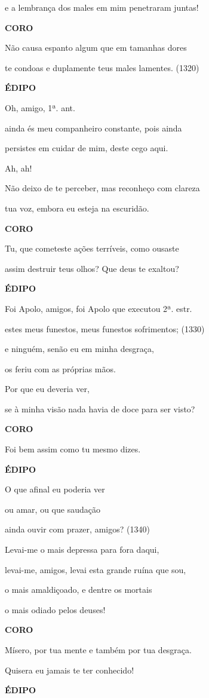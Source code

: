 e a lembrança dos males em mim penetraram juntas!

\textbf{CORO}

Não causa espanto algum que em tamanhas dores

te condoas e duplamente teus males lamentes. (1320)

\textbf{ÉDIPO}

Oh, amigo, 1ª. ant.

ainda és meu companheiro constante, pois ainda

persistes em cuidar de mim, deste cego aqui.

Ah, ah!

Não deixo de te perceber, mas reconheço com clareza

tua voz, embora eu esteja na escuridão.

\textbf{CORO}

Tu, que cometeste ações terríveis, como ousaste

assim destruir teus olhos? Que deus te exaltou?

\textbf{ÉDIPO}

Foi Apolo, amigos, foi Apolo que executou 2ª. estr.

estes meus funestos, meus funestos sofrimentos; (1330)

e ninguém, senão eu em minha desgraça,

os feriu com as próprias mãos.

Por que eu deveria ver,

se à minha visão nada havia de doce para ser visto?

\textbf{CORO}

Foi bem assim como tu mesmo dizes.

\textbf{ÉDIPO}

O que afinal eu poderia ver

ou amar, ou que saudação

ainda ouvir com prazer, amigos? (1340)

Levai-me o mais depressa para fora daqui,

levai-me, amigos, levai esta grande ruína que sou,

o mais amaldiçoado, e dentre os mortais

o mais odiado pelos deuses!

\textbf{CORO}

Mísero, por tua mente e também por tua desgraça.

Quisera eu jamais te ter conhecido!

\textbf{ÉDIPO}

